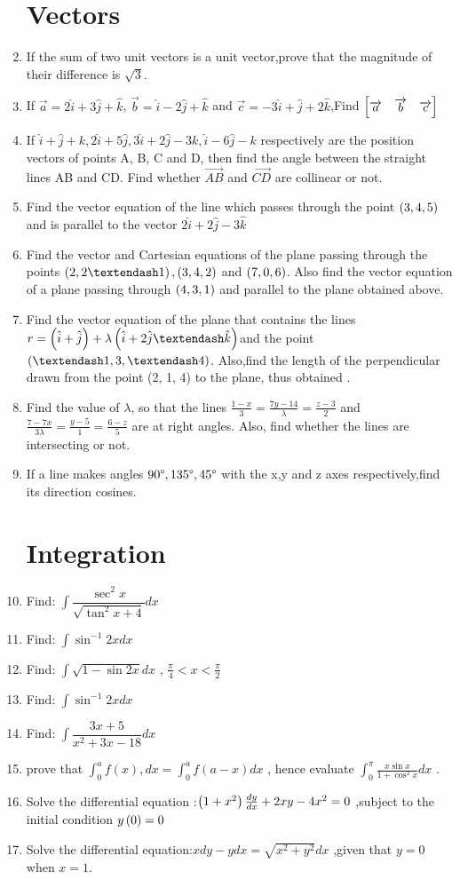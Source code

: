 \documentclass{article}
\begin{document}
\begin{enumerate}
\section{Vectors} 
\item If the sum of two unit vectors is a unit vector,prove that the magnitude of their difference is $\sqrt{3}$.
\item If $\overrightarrow{a}=2\hat{i}+3\hat{j}+\hat{k}$, $\overrightarrow{b}=\hat{i}-2\hat{j}+\hat{k}$ and $\overrightarrow{c}=-3\hat{i}+\hat{j}+2\hat{k}$,Find $\begin{bmatrix}\overrightarrow{a}&\overrightarrow{b}&\overrightarrow{c} \end{bmatrix}$
\item If $\hat{i}+\hat{j}+{k} ,  2\hat{i}+5\hat{j} ,  3\hat{i}+2\hat{j}-3{k} ,  \hat{i}-6\hat{j}-{k}$ respectively are the position vectors of points A, B, C and D, then find the angle between the straight lines AB and CD. Find whether $\overrightarrow{AB}$ and $\overrightarrow{CD}$ are collinear or not. 
\item Find the vector equation of the line which passes through the point $\left(3,4,5\right)$ and is parallel to the vector $2\hat{i}+2\hat{j}-3\hat{k}$
\item Find the vector and Cartesian equations of the plane passing through the points $\brak{2, 2 –1}, \brak{3, 4, 2}$ and $\left(7, 0, 6\right)$. Also find the vector equation of a plane passing through $\left(4, 3, 1\right)$ and parallel to the plane obtained above.
\item Find the vector equation of the plane that contains the lines $r = \brak{\hat{i}+\hat{j}}+\lambda \brak{\hat{i}+ 2\hat{j} –\hat{k}} $and the point $\brak{–1, 3, – 4}$. Also,find the length of the perpendicular drawn from the point (2, 1, 4) to the plane, thus obtained .
\item Find the value of $\lambda$, so that the lines $\frac{1-x}{3}=\frac{7y-14}{\lambda}=\frac{z-3}{2}$ and $\frac{7-7x}{3\lambda}=\frac{y-5}{1}=\frac{6-z}{5}$ are at right angles. Also, find whether the lines are intersecting or not.       
\item If a line makes angles $ 90\degree,135\degree,45\degree$ with the x,y and z axes respectively,find its direction cosines.
\section{Integration}
\item  Find: $\int \dfrac{\sec^2x}{\sqrt{\tan^2x+4}} dx$
\item Find: $\int\sin^{-1}2x dx $
\item \noindent Find: $\int\sqrt{1-\sin2x} dx$ , $\frac{\pi}{4}< x < \frac{\pi}{2}$
\item Find: $ \int\sin^{-1}2x dx$
\item Find: $\int\dfrac{3x+5}{x^2+3x-18} dx$
\item prove that $\int_{0}^{a}f(x),dx=\int_{0}^{a}f(a-x) dx$ , hence evaluate $\int_{0}^{\pi}\frac{x\sin x}{1+\cos^2x}dx$ .
\item Solve the differential equation :$\left(1+x^2\right)\frac{dy}{dx}+2xy-4x^2=0$ ,subject to the initial condition $y\left(0\right)=0$ 
\item Solve the differential equation:$xdy-ydx=\sqrt{x^2+y^2}dx$ ,given that $y=0$ when $x=1$.

\end{enumerate}
\end{document}
